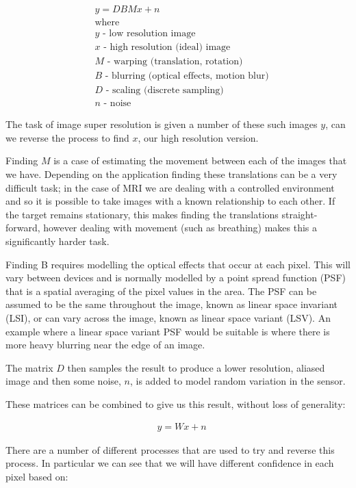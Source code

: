 \documentclass[
  oneside,
  11pt, a4paper,
  footinclude=true,
  headinclude=true,
  cleardoublepage=empty
]{scrbook}
\begin{document}
\begin{align*} 
& y = DBMx + n \nonumber \\ 
& \text{where} \\
& y \text{ - low resolution image} \nonumber \\
& x \text{ - high resolution (ideal) image} \nonumber \\
& M \text{ - warping (translation, rotation)} \nonumber \\
& B \text{ - blurring (optical effects, motion blur)} \nonumber \\
& D \text{ - scaling (discrete sampling)} \nonumber \\
& n \text{ - noise} \nonumber
\end{align*}

The task of image super resolution is given a number of these such images $y$, can we reverse the process to find $x$, our high resolution version.

Finding $M$ is a case of estimating the movement between each of the images that we have. Depending on the application finding these translations can be a very difficult task; in the case of MRI we are dealing with a controlled environment and so it is possible to take images with a known relationship to each other. If the target remains stationary, this makes finding the translations straight-forward, however dealing with movement (such as breathing) makes this a significantly harder task.

Finding B requires modelling the optical effects that occur at each pixel. This will vary between devices and is normally modelled by a point spread function (PSF) that is a spatial averaging of the pixel values in the area. The PSF can be assumed to be the same throughout the image, known as linear space invariant (LSI), or can vary across the image, known as linear space variant (LSV). An example where a linear space variant PSF would be suitable is where there is more heavy blurring near the edge of an image.

The matrix $D$ then samples the result to produce a lower resolution, aliased image and then some noise, $n$, is added to model random variation in the sensor.

These matrices can be combined to give us this result, without loss of generality:

\begin{align}
& y = Wx + n \nonumber
\end{align}

There are a number of different processes that are used to try and reverse this process. In particular we can see that we will have different confidence in each pixel based on:
\end{document}
